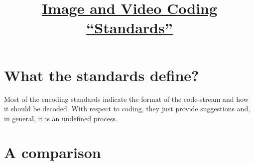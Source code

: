 

\title{\href{https://sistemas-multimedia.github.io/contents/standards/}{Image and Video Coding ``Standards''}}

\maketitle

\tableofcontents

\section{What the standards define?}
Most of the encoding standards indicate the format of the code-stream
and how it should be decoded. With respect to coding, they just provide
suggestions and, in general, it is an undefined process.

\section{A comparison~\cite{wikipedia}}

